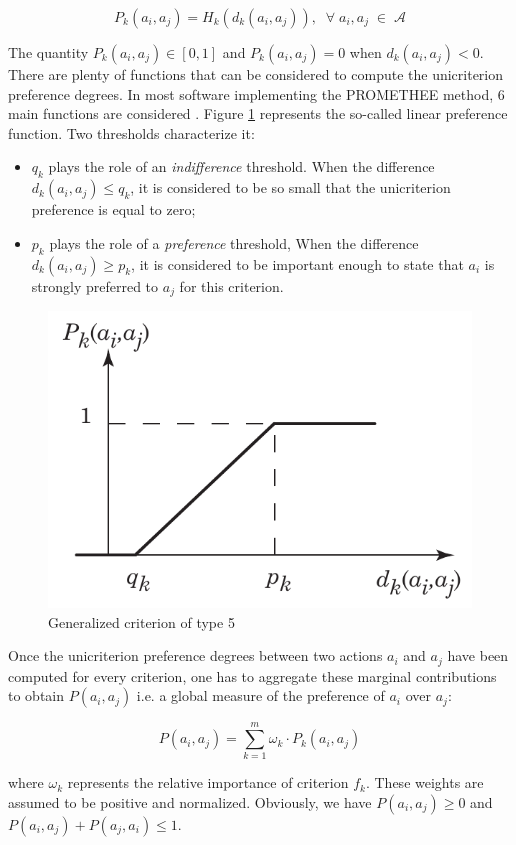 \documentclass{svmono}
\begin{document}
$$
P_k(a_i,a_j) = H_k(d_k(a_i,a_j)), \; \; \forall \; a_i, a_j \; \in \; \mathcal{A}
$$

The quantity $P_k(a_i,a_j) \in [0, 1]$ and $P_k(a_i,a_j)=0$ when $d_k(a_i,a_j) <0$. There are plenty of functions that can be considered to compute the unicriterion preference degrees. In most software implementing the PROMETHEE method, $6$ main functions are considered \cite{Hayez}. Figure \ref{fig:criterion5} represents the so-called linear preference function. Two thresholds characterize it:
\begin{itemize}
\item $q_k$ plays the role of an \textit{indifference} threshold. When the difference $d_k(a_i,a_j) \leq q_k$, it is considered to be so small that the unicriterion preference is equal to zero;
\item $p_k$ plays the role of a \textit{preference} threshold, When the difference $d_k(a_i,a_j) \geq p_k$, it is considered to be important enough to state that $a_i$ is strongly preferred to $a_j$ for this criterion.
\end{itemize}

\begin{figure}[h!]
\begin{center}
\includegraphics[width=0.7\linewidth]{criterion5.pdf}
\end{center}
\caption{Generalized criterion of type 5}
\label{fig:criterion5}
\end{figure}

Once the unicriterion preference degrees between two actions $a_i$ and $a_j$ have been computed for every criterion, one has to aggregate these marginal contributions to obtain $P(a_i,a_j)$  i.e. a global measure of the preference of $a_i$ over $a_j$:

$$
P(a_i,a_j)= \sum_{k=1}^{m} \omega_k \cdot P_k(a_i,a_j)
$$

where $\omega_k$ represents the relative importance of criterion $f_k$. These weights are assumed to be positive and normalized. Obviously, we have $P(a_i,a_j) \geq 0$ and $P(a_i,a_j) + P(a_j,a_i) \leq 1$.\
\end{document}
